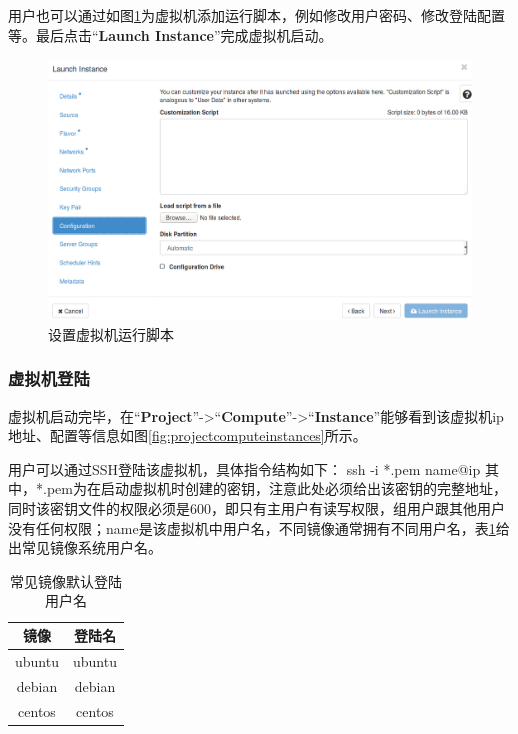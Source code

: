 \documentclass[12pt]{ctexart}%
\begin{document}
用户也可以通过如图\ref{fig:launchInstanceConfig}为虚拟机添加运行脚本，例如修改用户密码、修改登陆配置等。最后点击``\textbf{Launch Instance}''完成虚拟机启动。
\begin{figure}[!htb]
\centering
\includegraphics[width=6in]{./figures/LaunchInstanceConfig}
\caption{设置虚拟机运行脚本}
\label{fig:launchInstanceConfig}
\end{figure}

\subsubsection{虚拟机登陆}
虚拟机启动完毕，在``\textbf{Project}''->``\textbf{Compute}''->``\textbf{Instance}''能够看到该虚拟机ip地址、配置等信息如图\ref{fig:projectcomputeinstances}所示。

用户可以通过SSH登陆该虚拟机，具体指令结构如下：
ssh -i *.pem name@ip
其中，*.pem为在启动虚拟机时创建的密钥，注意此处必须给出该密钥的完整地址，同时该密钥文件的权限必须是600，即只有主用户有读写权限，组用户跟其他用户没有任何权限；name是该虚拟机中用户名，不同镜像通常拥有不同用户名，表\ref{tab:userName}给出常见镜像系统用户名。
\begin{table}[!htb]
\centering
\caption{常见镜像默认登陆用户名}
\label{tab:userName}
\begin{tabular}{|c|c|} \hline
 镜像 &登陆名\\ \hline
 ubuntu& ubuntu\\ \hline
 debian& debian\\ \hline
 centos& centos\\ \hline
\end{tabular}
\end{table}
\end{document}
